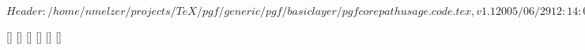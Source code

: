 \ProvidesFileRCS $Header: /home/nmelzer/projects/TeX/pgf/generic/pgf/basiclayer/pgfcorepathusage.code.tex,v 1.1 2005/06/29 12:14:04 tantau Exp $

%


%
%
%

[]{\def\pgf@up@stroke{stroke}}
[]{\def\pgf@up@stroke{stroke}}
[]{\def\pgf@up@fill{fill}}
[]{\def\pgf@up@clip{clip}}
[]{}
[]{\def\pgf@up@bb{\pgf@relevantforpicturesizefalse}}

\def\pgfusepath#1{%
  \let\pgf@up@stroke\@empty%
  \let\pgf@up@fill\@empty%
  \let\pgf@up@clip\@empty%
  \let\pgf@up@discard\@empty%
  \let\pgf@up@bb\@empty%
  \setkeys{pgfup}{#1}%
  \expandafter\def\expandafter\pgf@up@action\expandafter{\csname pgfsys@\pgf@up@fill\pgf@up@stroke\endcsname}%
  \ifx\pgf@up@stroke\@empty%
    \ifx\pgf@up@fill\@empty%
      \ifx\pgf@up@clip\@empty%
        \let\pgf@up@action=\@empty%
        \pgfsyssoftpath@setcurrentpath\@empty%
      \else%
        \let\pgf@up@action=\pgfsys@discardpath%
      \fi%
    \fi%
  \fi%
  \pgfprocessround{\pgfsyssoftpath@currentpath}{\pgfsyssoftpath@currentpath}%
  \ifx\pgf@up@clip\@empty%
    \ifx\pgf@up@stroke\@empty%
      \pgfsyssoftpath@invokecurrentpath%
      \pgfsyssoftpath@getcurrentpath\pgf@last@used@path%
      \pgf@up@action%
    \else%
      \pgf@check@for@arrows%
      \ifpgf@drawarrows%
        \pgf@shorten@path@as@needed%
        \pgfsyssoftpath@invokecurrentpath%
        \pgfsyssoftpath@getcurrentpath\pgf@last@used@path%
        \pgf@up@action%
        \pgfsyssoftpath@setcurrentpath\@empty%
        \pgf@add@arrows@as@needed%
      \else%
        \pgfsyssoftpath@invokecurrentpath%
        \pgfsyssoftpath@getcurrentpath\pgf@last@used@path%
        \pgf@up@action%
      \fi%
    \fi%
  \else%
    \pgfsyssoftpath@invokecurrentpath%
    \pgfsyssoftpath@getcurrentpath\pgf@last@used@path%
    \pgfsys@clipnext%
    \pgf@up@action%
    \pgf@relevantforpicturesizefalse%
  \fi%
  \pgf@up@bb%
  \pgfsyssoftpath@setcurrentpath\@empty%
  \pgf@resetpathsizes%
  \ignorespaces%
}


